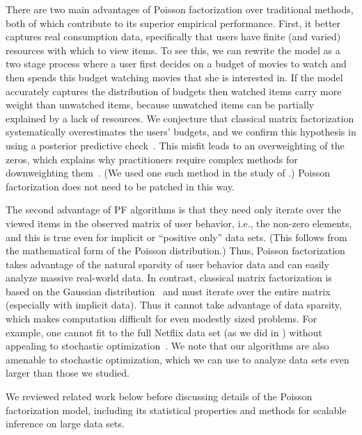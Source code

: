 
There are two main advantages of Poisson factorization over
traditional methods, both of which contribute to its superior
empirical performance.  First, it better captures real consumption
data, specifically that users have finite (and varied) resources with
which to view items.  To see this, we can rewrite the model as a two
stage process where a user first decides on a budget of movies to
watch and then spends this budget watching movies that she is
interested in.  If the model accurately captures the distribution of
budgets then watched items carry more weight than unwatched items,
because unwatched items can be partially explained by a lack of
resources. We conjecture that classical matrix factorization
systematically overestimates the users' budgets, and we confirm this
hypothesis in  using a posterior predictive
check~\cite{Gelman:1996}.  This misfit leads to an overweighting of
the zeros, which explains why practitioners require complex methods
for downweighting
them~\cite{Hu:2008p9402,Gantner:2012p9364,Dror:2012a,Paquet:2013p9197}.
(We used one such method in the study of .)  Poisson
factorization does not need to be patched in this way.

The second advantage of PF algorithms is that they need only iterate
over the viewed items in the observed matrix of user behavior, i.e.,
the non-zero elements, and this is true even for implicit or
``positive only'' data sets.  (This follows from the mathematical form
of the Poisson distribution.)  Thus, Poisson factorization takes
advantage of the natural sparsity of user behavior data and can easily
analyze massive real-world data. In contrast, classical matrix
factorization is based on the Gaussian
distribution~\cite{Salakhutdinov:2008} and must iterate over the
entire matrix (especially with implicit data).  Thus it cannot take
advantage of data sparsity, which makes computation difficult for even
modestly sized problems.  For example, one cannot fit to the full
Netflix data set (as we did in ) without appealing to
stochastic optimization~\cite{Mairal:2010}.  We note that our
algorithms are also amenable to stochastic optimization, which we can
use to analyze data sets even larger than those we studied.


We reviewed related work below before discussing details of the
Poisson factorization model, including its statistical properties and
methods for scalable inference on large data sets.


